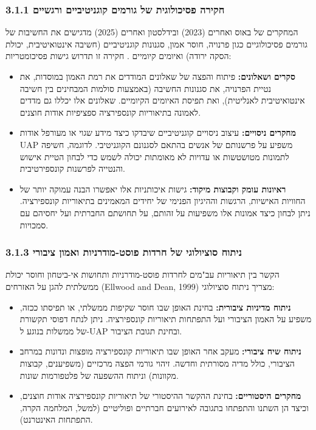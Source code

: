 \documentclass[12pt,a4paper]{article}
\begin{document}
\subsubsection*{3.1.1 חקירה פסיכולוגית של גורמים קוגניטיביים ורגשיים}
המחקרים של באוס ואחרים (2023) ובידלסטון ואחרים (2025) מדגישים את החשיבות של גורמים פסיכולוגיים כגון פרנויה, חוסר אמון, סגנונות קוגניטיביים (חשיבה אינטואיטיבית, יכולת הסקה ירודה) ואיומים קיומיים \cite{bowes2023conspiracy, biddlestone2025conspiracy}. חקירה זו תדרוש גישות פסיכומטריות:
\begin{itemize}
    \item \textbf{סקרים ושאלונים:} פיתוח והפצה של שאלונים המודדים את רמת האמון במוסדות, את נטיית הפרנויה, את סגנונות החשיבה (באמצעות סולמות המבחינים בין חשיבה אינטואיטיבית לאנליטית), ואת תפיסת האיומים הקיומיים. שאלונים אלו יכללו גם מדדים לאמונה בתיאוריות קונספירציה ספציפיות אודות חוצנים.
    \item \textbf{מחקרים ניסויים:} עיצוב ניסויים קוגניטיביים שיבדקו כיצד מידע שגוי או מעורפל אודות UAP משפיע על פרשנותם של אנשים בהתאם לסגנונם הקוגניטיבי. לדוגמה, חשיפה לתמונות מטושטשות או עדויות לא מאומתות יכולה לשמש כדי לבחון הטיית אישוש והנטייה לפרשנות קונספירטיבית.
    \item \textbf{ראיונות עומק וקבוצות מיקוד:} גישות איכותניות אלו יאפשרו הבנה עמוקה יותר של החוויות האישיות, הרגשות וההיגיון הפנימי של יחידים המאמינים בתיאוריות קונספירציה. ניתן לבחון כיצד אמונות אלו משפיעות על זהותם, על תחושתם החברתית ועל יחסיהם עם סמכויות.
\end{itemize}

\subsubsection*{3.1.3 ניתוח סוציולוגי של חרדות פוסט-מודרניות ואמון ציבורי}
הקשר בין תיאוריות עב"מים לחרדות פוסט-מודרניות ותחושות אי-ביטחון וחוסר יכולת ממשלתית להגן על האזרחים (Ellwood and Dean, 1999) \cite{ellwood1999ufo} מצריך ניתוח סוציולוגי:
\begin{itemize}
    \item \textbf{ניתוח מדיניות ציבורית:} בחינת האופן שבו חוסר שקיפות ממשלתי, או תפיסתו ככזה, משפיע על האמון הציבורי ועל התפתחות תיאוריות קונספירציה. ניתן לנתח דפוסי תקשורת של ממשלות בנוגע ל-UAP ובחינת תגובת הציבור.
    \item \textbf{ניתוח שיח ציבורי:} מעקב אחר האופן שבו תיאוריות קונספירציה מופצות ונדונות במרחב הציבורי, כולל מדיה מסורתית וחדשה. זיהוי גורמי הפצה מרכזיים (משפיענים, קבוצות מקוונות) וניתוח ההשפעה של פלטפורמות שונות.
    \item \textbf{מחקרים היסטוריים:} בחינת ההקשר ההיסטורי של תיאוריות קונספירציה אודות חוצנים, וכיצד הן השתנו והתפתחו בתגובה לאירועים חברתיים ופוליטיים (למשל, המלחמה הקרה, התפתחות האינטרנט).
\end{itemize}
\end{document}
